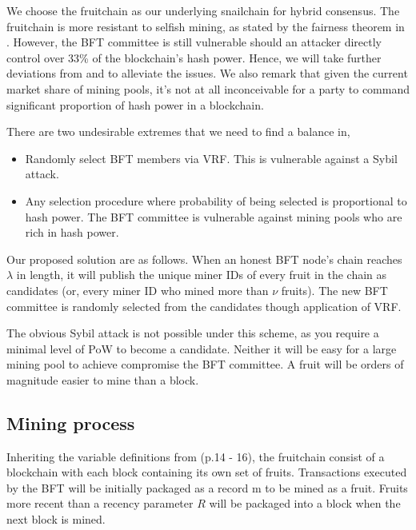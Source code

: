 \documentclass[9pt,oneside]{amsart}
\begin{document}
\begin{multicols}{2}
We choose the fruitchain\cite{pass2017fruit} as our underlying snailchain for hybrid consensus. The fruitchain is more resistant to selfish mining, as stated by the fairness theorem in \cite{pass2017fruit}. However, the BFT committee is still vulnerable should an attacker directly control over 33\% of the blockchain's hash power. Hence, we will take further deviations from \cite{pass2017hybrid} and \cite{pass2017fruit} to alleviate the issues. We also remark that given the current market share of mining pools, it's not at all inconceivable for a party to command significant proportion of hash power in a blockchain. 

There are two undesirable extremes that we need to find a balance in, 
\begin{itemize}
	\item Randomly select BFT members via VRF\cite{micali1999verifiable}. This is vulnerable against a Sybil attack.
	\newline
	\item Any selection procedure where probability of being selected is proportional to hash power. The BFT committee is vulnerable against mining pools who are rich in hash power. 
\end{itemize} 


Our proposed solution are as follows. When an honest BFT node's chain reaches $\lambda$ in length, it will publish the unique miner IDs of every fruit in the chain as candidates (or, every miner ID who mined more than $\nu$ fruits). The new BFT committee is randomly selected from the candidates though application of VRF.  

The obvious Sybil attack is not possible under this scheme, as you require a minimal level of PoW to become a candidate. Neither it will be easy for a large mining pool to achieve compromise the BFT committee. A fruit will be orders of magnitude easier to mine than a block. 


\subsection{Mining process}

Inheriting the variable definitions from \cite{pass2017fruit} (p.14 - 16), the fruitchain consist of a blockchain with each block containing its own set of fruits. Transactions executed by the BFT will be initially packaged as a record $\mathrm{m}$ to be mined as a fruit. Fruits more recent than a recency parameter $R$ will be packaged into a block when the next block is mined. 


\end{multicols}
\end{document}
